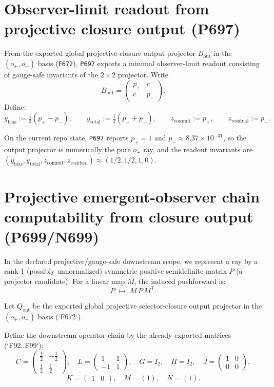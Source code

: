 \documentclass[11pt,a4paper]{article}
\begin{document}
\section{Observer-limit readout from projective closure output (P697)}

From the exported global projective closure output projector $B_{\mathrm{out}}$ in the $(o_+,o_-)$ basis (\texttt{F672}), \texttt{P697} exports a minimal
observer-limit readout consisting of gauge-safe invariants of the $2\times 2$ projector.
Write
\[
B_{\mathrm{out}}=
\begin{pmatrix}
p_+ & c\\
c & p_-
\end{pmatrix}.
\]
Define:
\[
y_{\mathrm{bias}}:=\tfrac12(p_+-p_-),\qquad
y_{\mathrm{total}}:=\tfrac12(p_++p_-),\qquad
z_{\mathrm{commit}}:=p_+,\qquad
z_{\mathrm{residual}}:=p_-.
\]

On the current repo state, \texttt{P697} reports $p_+=1$ and $p_-\approx 8.37\times 10^{-31}$, so the output projector is numerically the pure $o_+$ ray,
and the readout invariants are $(y_{\mathrm{bias}},y_{\mathrm{total}},z_{\mathrm{commit}},z_{\mathrm{residual}})\approx (1/2,1/2,1,0)$.
\section{Projective emergent-observer chain computability from closure output (P699/N699)}

In the declared projective/gauge-safe downstream scope, we represent a ray by a rank‑1 (possibly unnormalized) symmetric positive semidefinite matrix $P$
(a projector candidate). For a linear map $M$, the induced pushforward is:
\[
P \;\mapsto\; M\,P\,M^{\mathsf T}.
\]

Let $Q_{\mathrm{out}}$ be the exported global projective selector-closure output projector in the $(o_+,o_-)$ basis (`F672`).

Define the downstream operator chain by the already exported matrices (`F92..F99`):
\[
C=\begin{pmatrix} \tfrac12 & -\tfrac12\\ \tfrac12 & \tfrac12 \end{pmatrix},\quad
L=\begin{pmatrix} 1&1\\ -1&1 \end{pmatrix},\quad
G=I_2,\quad H=I_2,\quad
J=\begin{pmatrix}1&0\\0&0\end{pmatrix},
\]
\[
K=\begin{pmatrix}1&0\end{pmatrix},\quad
M=(1),\quad N=(1).
\]
\end{document}
